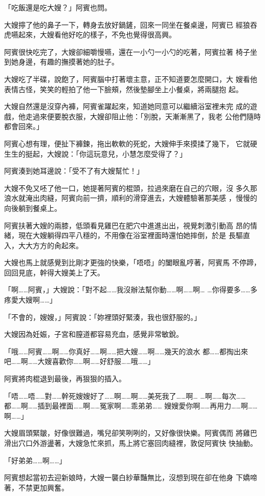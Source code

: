 「吃飯還是吃大嫂？」阿賓也問。

大嫂擰了他的鼻子一下，轉身去放好鍋鏟，回來一同坐在餐桌邊，阿賓已
經狼吞虎嚥起來，大嫂看他好吃的樣子，不免也覺得很高興。

阿賓很快吃完了，大嫂卻細嚼慢嚥，還在一小勺一小勺的吃著，阿賓拉著
椅子坐到她身邊，有趣的撫摸著她的肚子。

大嫂吃了半碟，說飽了，阿賓腦中打著壞主意，正不知道要怎麼開口，大
嫂看他表情古怪，笑笑的輕拍了他一下臉頰，然後墊腳坐上小餐桌，將兩腿抱
起。

大嫂自然還是沒穿內褲，阿賓雀躍起來，知道她同意可以繼續浴室裡未完
成的遊戲，他走過來便要脫衣服，大嫂卻阻止他：「別脫，天漸漸黑了，我老
公他們隨時都會回來。」

阿賓心想有理，便扯下褲鍊，拖出軟軟的死蛇，大嫂伸手來摸揉了幾下，
它就硬生生的挺起，大嫂說：「你這玩意兒，小慧怎麼受得了？」

阿賓湊到她耳邊說：「受不了有大嫂幫忙！」

大嫂不免又呸了他一口，她提著阿賓的棍頭，拉過來磨在自己的穴眼，沒
多久那浪水就淹出肉縫，阿賓向前一擠，順利的滑穿進去，大嫂體驗著那美感
，慢慢的向後躺到餐桌上。

阿賓扶著大嫂的兩膝，低頭看見雞巴在肥穴中進進出出，視覺刺激引動高
昂的情緒，現在大嫂躺得四平八穩的，不用像在浴室裡面時還怕她摔倒，於是
長驅直入，大大方方的肏起來。

大嫂也馬上就感覺到比剛才更強的快樂，「唔唔」的闔眼亂哼著，阿賓馬
不停蹄，回回見底，幹得大嫂美上了天。

「啊……阿賓，」大嫂說：「對不起……我沒辦法幫你動……啊……啊…
…你得要多……多疼愛大嫂啊……」

「不會的，嫂嫂，」阿賓說：「妳裡頭好緊湊，我也很舒服的。」

大嫂因為妊娠，子宮和膣道都容易充血，感覺非常敏銳。

「哦……阿賓……啊……你真好……啊……把大嫂……啊……幾天的浪水
都……都掏出來吧……啊……大嫂喜歡你……啊……好舒服……哦……」

阿賓將肉棍退到最後，再狠狠的插入。

「唔……唔……對……幹死嫂嫂好了……啊……啊……美死我了……啊…
…啊……每次……都……啊……插到最裡面……啊……冤家啊……乖弟弟……
嫂嫂愛你啊……再用力……啊……啊……」

大嫂眉頭緊皺，好像很難過，嘴兒卻笑咧咧的，又好像很快樂。阿賓偶而
將雞巴滑出穴口外游盪著，大嫂急忙來抓，馬上將它塞回肉縫裡，敦促阿賓快
快抽動。

「好弟弟……啊……」

阿賓想起當初去迎新娘時，大嫂一襲白紗華豔無比，沒想到現在卻在他身
下嬌啼著，不禁更加興奮。


